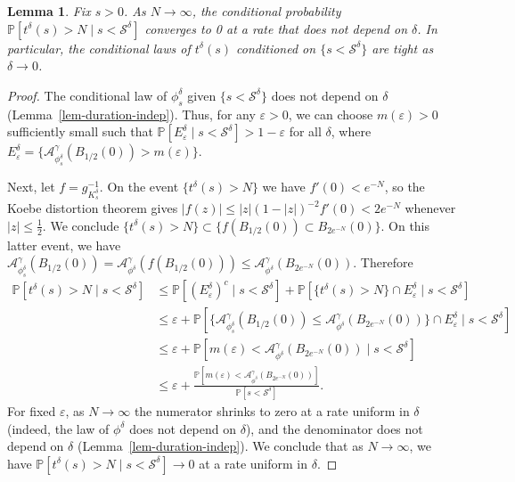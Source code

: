 \documentclass[a4paper]{article}
\numberwithin{equation}{section}
\def\eps{\varepsilon}
\renewcommand{\P}{\mathbb{P}}
\newcommand{\cA}{\mathcal{A}}
\newcommand{\qduration}{\mathcal{S}}
\newtheorem{lemma}[theorem]{Lemma}
\theoremstyle{remark}
\numberwithin{equation}{section}
\begin{document}
\begin{lemma}\label{lem-tight-t}
    Fix $s>0$. As $N \to \infty$, the conditional probability $\P[t^\delta(s) > N \mid s < \qduration^\delta]$ converges to 0 at a rate that does not depend on $\delta$. 
    In particular, the conditional laws of $t^\delta(s)$ conditioned on $\{ s < \qduration^\delta\}$ are tight as $\delta \to 0$.
\end{lemma}
\begin{proof}
    The conditional law of $\phi^{\delta}_s$ given $\{ s < \qduration^{\delta}\}$ does not depend on $\delta$ (Lemma~\ref{lem-duration-indep}). Thus, for any $\eps > 0$, we can choose $m(\eps) > 0$ sufficiently small such that 
   $\P[E^\delta_\eps \mid s < \qduration^{\delta}] > 1 - \eps$ for all $\delta$, where $E^\delta_\eps =\{\cA^\gamma_{\phi_s^{\delta}}(B_{1/2}(0)) > m(\eps)\}$. 
   
   Next, let $f =  g_{K_s^\delta}^{-1}$. On the event $\{t^\delta(s) > N\}$ we have $f'(0) < e^{-N}$, so the Koebe distortion theorem gives $|f(z)| \leq |z|(1-|z|)^{-2} f'(0) < 2 e^{-N}$ whenever $|z| \leq \frac12$. We conclude $\{ t^\delta(s) > N \} \subset \{f(B_{1/2}(0)) \subset B_{2e^{-N}}(0)\}$. On this latter event, we have $\cA^\gamma_{\phi_s^\delta}(B_{1/2}(0)) = \cA^\gamma_{\phi^\delta}(f(B_{1/2}(0))) \leq \cA^\gamma_{\phi^\delta}(B_{2e^{-N}}(0))$. Therefore 
   \begin{align*}
       \P[t^{\delta}(s) > N \mid s < \qduration^{\delta}] &\leq \P[(E^\delta_\eps)^c \mid s < \qduration^{\delta}] + \P[\{t^{\delta}(s) > N\} \cap E^\delta_\eps \mid s < \qduration^{\delta}] \\
       &\leq \eps + \mathbb{P}[\{\cA^\gamma_{\phi_s^{\delta}}(B_{1/2}(0)) \leq \cA^\gamma_{\phi^{\delta}}(B_{2e^{-N}}(0)) \} \cap E^\delta_\eps \mid s < \qduration^{\delta}] \\
       &\leq \eps + \P[m (\eps) < \cA^\gamma_{\phi^{\delta}}(B_{2e^{-N}}(0)) \mid s < \qduration^{\delta}] \\
       &\leq \eps + \frac{\P[m (\eps) < \cA^\gamma_{\phi^{\delta}}(B_{2e^{-N}}(0))]}{\P[ s < \qduration^{\delta}]}.
   \end{align*}
   For fixed $\eps$, as $N \to \infty$ the numerator shrinks to zero at a rate uniform in $\delta$ (indeed, the law of $\phi^{\delta}$ does not depend on $\delta$), and the denominator does not depend on $\delta$ (Lemma~\ref{lem-duration-indep}). We conclude that as $N \to \infty$, we have $\P[t^{\delta}(s) > N \mid s < \qduration^{\delta}] \to 0$ at a rate uniform in $\delta$. 
\end{proof}
\end{document}
